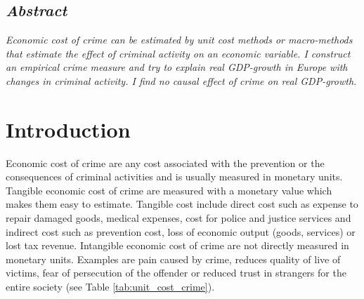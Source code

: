 \documentclass[a4paper,12pt]{article}
\begin{document}
% 
\tableofcontents   %

\listoftables 

\listoffigures
\newpage

\setcounter{page}{1}        %




\subsection*{\textit{Abstract}}

\textit{Economic cost of crime can be estimated by unit cost methods or  macro-methods that estimate the effect of criminal activity on an economic variable. I construct an empirical crime measure and try to explain real GDP-growth in Europe with changes in criminal activity. I find no causal effect of crime on real GDP-growth.}



\section{Introduction}
\label{Introduction}
Economic cost of crime are any cost associated with the prevention or the consequences of criminal activities and is usually measured in monetary units.
Tangible economic cost of crime are measured with a monetary value which makes them easy to estimate. Tangible cost include direct cost such as expense to repair damaged goods, medical expenses, cost for police and justice services and indirect cost such as prevention cost, loss of economic output (goods, services) or lost tax revenue.
Intangible economic cost of crime are not directly measured in monetary units. Examples are pain caused by crime, reduces quality of live of victims, fear of persecution of the offender or reduced trust in strangers for the entire society (see Table \ref{tab:unit_cost_crime}).  \citep{kosten_nutzen_entorf} 
\end{document}
